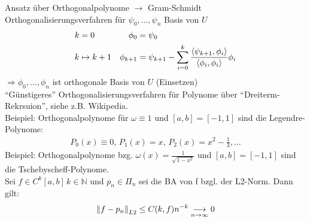 Ansatz über Orthogonalpolynome $\rightarrow$ Gram-Schmidt Orthogonalisierungsverfahren
für $\psi_0,\ldots,\psi_n$ Basis von $U$
\begin{align*}
  k &= 0 & \phi_0 &= \psi_0\\
  k &\mapsto k+1 & \phi_{k+1} &= \psi_{k+1} - \sum\limits_{i=0}^{k}{\frac{\left\langle \psi_{k+1}, \phi_i \right\rangle}{\left\langle \phi_i, \phi_i \right\rangle}\phi_i}
\end{align*}
$\Rightarrow \phi_0,\ldots,\phi_n$ ist orthogonale Basis von $U$ (Einsetzen)\\
``Günstigeres'' Orthogonalisierungsverfahren für Polynome über ``Dreiterm-Rekrsuion'', siehe z.B. Wikipedia.\\
Beispiel: Orthogonalpolynome für $\omega \equiv 1$ und $[a,b]=[-1,1]$ sind die Legendre-Polynome:
\begin{align*}
  P_0(x)\equiv 0, \, P_1(x)=x, \, P_2(x)=x^2 - \frac{1}{3},\ldots
\end{align*}
Beispiel: Orthogonalpolynome bzg. $\omega(x)=\frac{1}{\sqrt{1-x^2}}$ und $[a,b]=[-1,1]$ sind die Tschebyscheff-Polynome.\\
 Sei $f \in C^k[a,b]\, k \in \mathbb{N}$ und $p_n \in \Pi_n$ sei die BA von f bzgl. der L2-Norm. Dann gilt:
\begin{align*}
  \left\lVert f-p_n \right\rVert_{L2} \leq C(k,f)n^{-k} \underset{n \to \infty}{\longrightarrow} 0
\end{align*}
